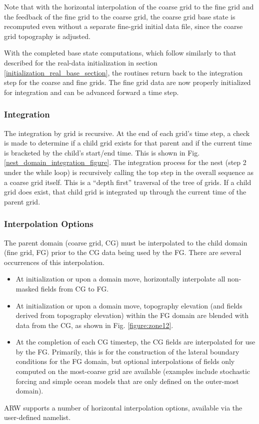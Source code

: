 Note that with the horizontal interpolation of the coarse grid 
to the fine grid and the feedback of the fine grid to the coarse 
grid, 
the coarse grid base state is recomputed 
even without a separate fine-grid initial data file, 
since the coarse grid topography is adjusted.

With the completed base state computations, which follow similarly to
that described for the real-data initialization in section
\ref{initialization_real_base_section},
the routines return 
back to the integration step for the coarse and fine grids.
The fine grid data are now properly initialized for integration and
can be advanced forward a time step.

\subsubsection{Integration}

The integration by grid is recursive.  At the end of each grid's time step, a check
is made to determine if a child grid exists for that parent and if the
current time is bracketed by the child's start/end time.  
This is shown in Fig. \ref{nest_domain_integration_figure}.  The integration process for the nest (step 2 under the
while loop) is recursively calling the top step in the overall sequence as a coarse grid itself.
This is a ``depth first'' 
traversal of the tree of grids.
If a child grid does exist, that child grid is integrated up through the current time of 
the parent grid.

\subsubsection{Interpolation Options}

The parent domain (coarse grid, CG) must be interpolated to the child domain 
(fine grid, FG) prior to the CG data being used by the FG. There are several 
occurrences of this interpolation.
\begin{itemize}\setlength{\parskip}{-4pt}
\item At initialization or upon a domain move, horizontally interpolate all 
non-masked fields from CG to FG.
\item At initialization or upon a domain move, topography elevation (and 
fields derived from topography elevation) within the FG domain are blended 
with data from the CG, as shown in Fig. \ref{figure:zone12}.
\item At the completion of each CG timestep, the CG fields are interpolated
for use by the FG. Primarily, this is for the construction of the lateral boundary 
conditions for the FG domain, but optional interpolations of fields only computed 
on the most-coarse grid are available (examples include stochastic forcing and 
simple ocean models that are only defined on the outer-most domain).
\end{itemize}
\noindent 
ARW supports a number of horizontal interpolation options, available via
the user-defined namelist.

